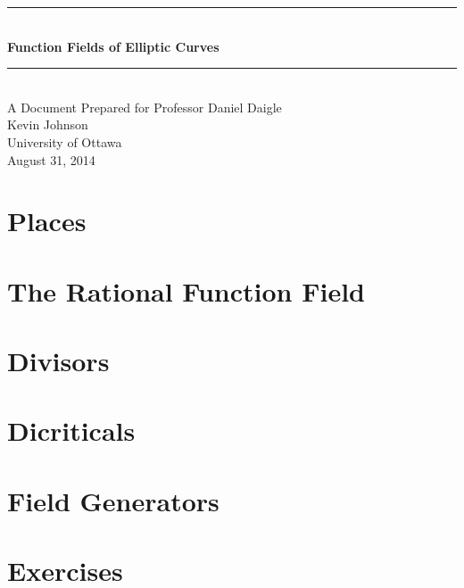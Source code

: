 \documentclass{amsart}
\numberwithin{equation}{subsection}
\newcommand{\HRule}{\rule{\linewidth}{0.5mm}}
\begin{document}
	\begin{titlepage}
		\begin{center}
			\HRule \\[0.4cm] %
			{\huge \bfseries Function Fields of Elliptic Curves}\\[0.4cm] 
			\HRule \\[0.8cm] %
			{\large A Document Prepared for Professor Daniel Daigle} \\[0.75cm]
			{\large Kevin Johnson} \\[0.75cm]
			{\large University of Ottawa} \\[0.75cm]
			{\large August 31, 2014}
		\end{center}
	\end{titlepage}

	\tableofcontents
	\pagebreak
	\section{Places}
		
	\section{The Rational Function Field}
		
	\section{Divisors}
		
	\section{Dicriticals}
		
	\section{Field Generators}
		
	\section{Exercises}
		
\end{document}
